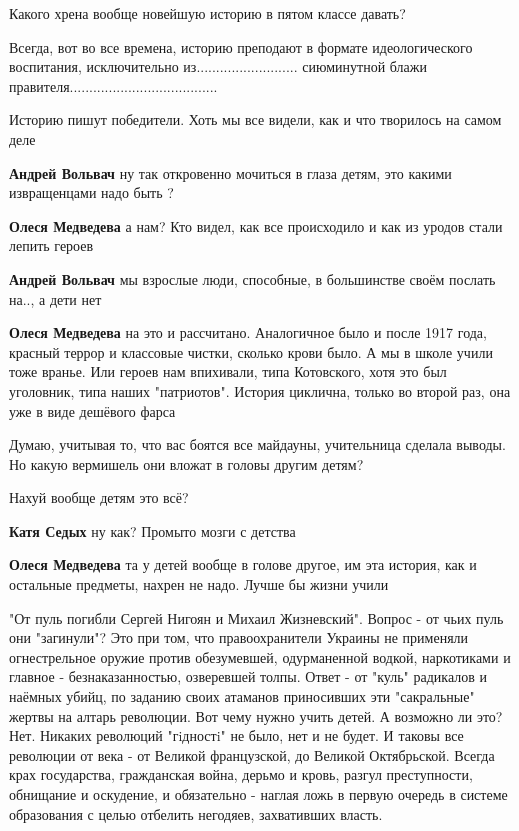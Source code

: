 \begin{itemize}
Какого хрена вообще новейшую историю в пятом классе давать?


Всегда, вот во все времена, историю преподают в формате идеологического
воспитания, исключительно из.......................... сиюминутной блажи
правителя......................................

Историю пишут победители. Хоть мы все видели, как и что творилось на самом деле

\begin{itemize} %
\textbf{Андрей Вольвач} ну так откровенно мочиться в глаза детям, это какими извращенцами надо быть ?

\textbf{Олеся Медведева} а нам? Кто видел, как все происходило и как из уродов стали лепить героев

\textbf{Андрей Вольвач} мы взрослые люди, способные, в большинстве своём послать на.., а дети нет

\textbf{Олеся Медведева} на это и рассчитано. Аналогичное было и после 1917 года, красный террор и классовые чистки, сколько крови было. А мы в школе учили тоже вранье. Или героев нам впихивали, типа Котовского, хотя это был уголовник, типа наших "патриотов". История циклична, только во второй раз, она уже в виде дешёвого фарса
\end{itemize} %

Думаю, учитывая то, что вас боятся все майдауны, учительница сделала выводы.
Но какую вермишель они вложат в головы другим детям?

Нахуй вообще детям это всё?

\begin{itemize} %
\textbf{Катя Седых} ну как? Промыто мозги с детства

\textbf{Олеся Медведева} та у детей вообще в голове другое, им эта история, как и остальные предметы, нахрен не надо. Лучше бы жизни учили
\end{itemize} %


\obeycr
"От пуль погибли Сергей Нигоян и Михаил Жизневский".
Вопрос - от чьих пуль они "загинули"? Это при том, что
правоохранители Украины не применяли огнестрельное оружие против обезумевшей, одурманенной водкой, наркотиками и главное - безнаказанностью, озверевшей толпы.
Ответ - от "куль" радикалов и наёмных убийц, по заданию своих атаманов приносивших эти "сакральные" жертвы на алтарь революции.
Вот чему нужно учить детей.
А возможно ли это?
Нет.
Никаких революций "гiдностi" не было, нет и не будет.
И таковы все революции от века - от Великой французской, до Великой Октябрьской.
Всегда крах государства, гражданская война, дерьмо и кровь, разгул преступности, обнищание и оскудение,
и обязательно - наглая ложь в первую очередь в системе
образования с целью отбелить негодяев, захвативших власть.
\restorecr


\end{itemize}
